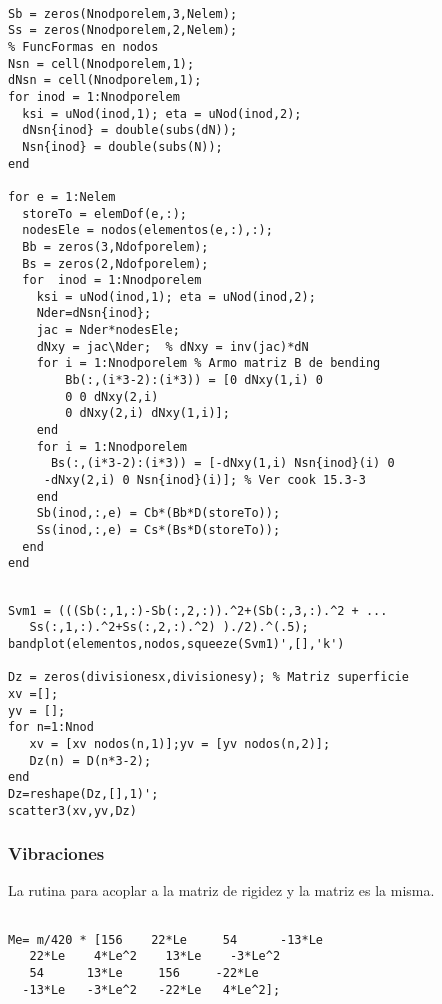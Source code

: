 \begin{code}
	\begin{verbatim}
	
Sb = zeros(Nnodporelem,3,Nelem);
Ss = zeros(Nnodporelem,2,Nelem);
% FuncFormas en nodos
Nsn = cell(Nnodporelem,1);
dNsn = cell(Nnodporelem,1);
for inod = 1:Nnodporelem
  ksi = uNod(inod,1); eta = uNod(inod,2);
  dNsn{inod} = double(subs(dN));
  Nsn{inod} = double(subs(N));
end

for e = 1:Nelem
  storeTo = elemDof(e,:);
  nodesEle = nodos(elementos(e,:),:);
  Bb = zeros(3,Ndofporelem);
  Bs = zeros(2,Ndofporelem);
  for  inod = 1:Nnodporelem
    ksi = uNod(inod,1); eta = uNod(inod,2);
    Nder=dNsn{inod};
    jac = Nder*nodesEle;
    dNxy = jac\Nder;  % dNxy = inv(jac)*dN     
    for i = 1:Nnodporelem % Armo matriz B de bending
        Bb(:,(i*3-2):(i*3)) = [0 dNxy(1,i) 0
        0 0 dNxy(2,i)
        0 dNxy(2,i) dNxy(1,i)];
    end
    for i = 1:Nnodporelem 
      Bs(:,(i*3-2):(i*3)) = [-dNxy(1,i) Nsn{inod}(i) 0
     -dNxy(2,i) 0 Nsn{inod}(i)]; % Ver cook 15.3-3
    end
    Sb(inod,:,e) = Cb*(Bb*D(storeTo));
    Ss(inod,:,e) = Cs*(Bs*D(storeTo));
  end
end
	\end{verbatim}
\end{code}

\begin{code}
	\begin{verbatim}
	
Svm1 = (((Sb(:,1,:)-Sb(:,2,:)).^2+(Sb(:,3,:).^2 + ...
   Ss(:,1,:).^2+Ss(:,2,:).^2) )./2).^(.5);
bandplot(elementos,nodos,squeeze(Svm1)',[],'k')

Dz = zeros(divisionesx,divisionesy); % Matriz superficie
xv =[];
yv = [];
for n=1:Nnod
   xv = [xv nodos(n,1)];yv = [yv nodos(n,2)];
   Dz(n) = D(n*3-2);
end
Dz=reshape(Dz,[],1)';
scatter3(xv,yv,Dz)
	\end{verbatim}
\end{code}

\subsubsection{Vibraciones}
La rutina para acoplar a la matriz de rigidez y la matriz es la misma.
\begin{code}
	\begin{verbatim}
	
Me= m/420 * [156    22*Le     54      -13*Le
   22*Le    4*Le^2    13*Le    -3*Le^2
   54      13*Le     156     -22*Le
  -13*Le   -3*Le^2   -22*Le   4*Le^2];
	\end{verbatim}
\end{code}


